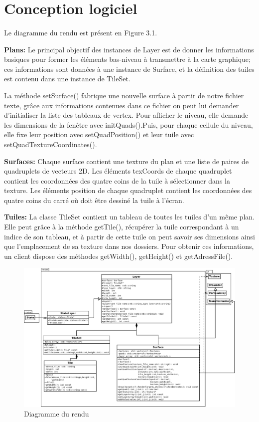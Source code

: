 \documentclass[12pt]{report}
\begin{document}
    
    \section{Conception logiciel}
    \paragraph{} Le diagramme du rendu est présent en Figure 3.1.
    
    \paragraphe{}\textbf{Plans:} Le principal objectif des instances de Layer est de donner les informations basiques pour former les éléments bas-niveau à transmettre à la carte graphique; ces informations sont données à une instance de Surface, et la déﬁnition des tuiles est contenu dans une instance de TileSet. 
    
    \paragraphe{}La méthode setSurface() fabrique une nouvelle surface à partir de notre fichier texte, grâce aux informations contenues dans ce fichier on peut lui demander d'initialiser la liste des tableaux de vertex. Pour afﬁcher le niveau, elle demande les dimensions de la fenêtre avec initQuads().Puis, pour chaque cellule du niveau, elle ﬁxe leur position avec setQuadPosition() et leur tuile avec setQuadTextureCoordinates(). 
    
    \paragraphe{}\textbf{Surfaces:} Chaque surface contient une texture du plan et une liste de paires de quadruplets de vecteurs 2D. Les éléments texCoords de chaque quadruplet contient les coordonnées des quatre coins de la tuile à sélectionner dans la texture. Les éléments position de chaque quadruplet contient les coordonnées des quatre coins du carré où doit être dessiné la tuile à l’écran. 
    
    \paragraphe{}\textbf{Tuiles:} La classe TileSet contient un tableau de toutes les tuiles d’un même plan. Elle peut grâce à la méthode getTile(), récupérer la tuile correspondant à un indice de son tableau, et à partir de cette tuile on peut savoir ses dimensions ainsi que l'emplacement de sa texture dans nos dossiers. Pour obtenir ces informations, un client dispose des méthodes getWidth(), getHeight() et getAdressFile(). 

    
    \newpage
\thispagestyle{empty}
\begin{landscape}
\begin{figure}[h]
    \begin{center}
    \includegraphics[scale=0.50]{render.png}
    \end{center}
    \caption{Diagramme du rendu}
\end{figure}
\end{landscape}
    
\newpage
\end{document}
